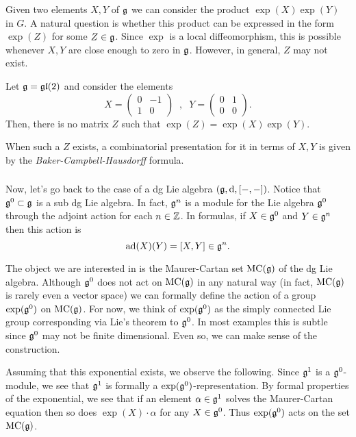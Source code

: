 \documentclass[11pt]{amsart}
\begin{document}
Given two elements $X,Y$ of $\mathfrak g$ we can consider the product $\exp(X) \exp(Y)$ in $G$.
A natural question is whether this product can be expressed in the form $\exp(Z)$ for some $Z \in \mathfrak g$. 
Since $\exp$ is a local diffeomorphism, this is possible whenever $X,Y$ are close enough to zero in $\mathfrak g$.
However, in general, $Z$ may not exist. 

\begin{eg}
Let $\mathfrak g = {\mathfrak{gl}}(2)$ and consider the elements
\[
X = \left(\begin{array}{cc} 0 & -1 \\ 1 & 0 \end{array} \right) \;\; , \;\; Y = \left(\begin{array}{cc} 0 & 1 \\ 0 & 0 \end{array} \right) .
\] 
Then, there is no matrix $Z$ such that $\exp(Z) = \exp(X) \exp(Y)$.
\end{eg}

When such a $Z$ exists, a combinatorial presentation for it in terms of $X,Y$ is given by the {\em Baker-Campbell-Hausdorff} formula.

\subsubsection{}

Now, let's go back to the case of a dg Lie algebra $(\mathfrak g, {\rm d}, [-,-])$. 
Notice that $\mathfrak g^0 \subset \mathfrak g$ is a sub dg Lie algebra. 
In fact, $\mathfrak g^n$ is a module for the Lie algebra $\mathfrak g^0$ through the adjoint action for each $n \in \mathbb Z$.  
In formulas, if $X \in \mathfrak g^0$ and $Y \in \mathfrak g^n$ then this action is
\[
{\rm ad}(X) (Y) = [X,Y]  \in \mathfrak g^n .
\]

The object we are interested in is the Maurer-Cartan set ${\rm MC}(\mathfrak g)$ of the dg Lie algebra. 
Although $\mathfrak g^0$ does not act on ${\rm MC}(\mathfrak g)$ in any natural way (in fact, ${\rm MC}(\mathfrak g)$ is rarely even a vector space) we can formally define the action of a group $\exp(\mathfrak g^0)$ on ${\rm MC}(\mathfrak g)$. 
For now, we think of $\exp(\mathfrak g^0)$ as the simply connected Lie group corresponding via Lie's theorem to $\mathfrak g^0$. 
In most examples this is subtle since $\mathfrak g^0$ may not be finite dimensional. 
Even so, we can make sense of the construction. 

Assuming that this exponential exists, we observe the following. 
Since $\mathfrak g^1$ is a $\mathfrak g^0$-module, we see that $\mathfrak g^1$ is formally a $\exp(\mathfrak g^0)$-representation. 
By formal properties of the exponential, we see that if an element $\alpha \in \mathfrak g^1$ solves the Maurer-Cartan equation then so does $\exp(X) \cdot \alpha$ for any $X \in \mathfrak g^0$. 
Thus $\exp(\mathfrak g^0)$ acts on the set ${\rm MC}(\mathfrak g)$.
\end{document}
